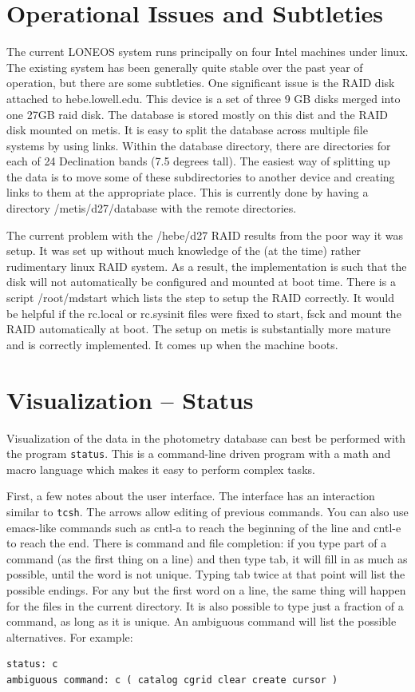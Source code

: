 \documentclass{article}
\begin{document}
\section{Operational Issues and Subtleties}

The current LONEOS system runs principally on four Intel machines
under linux.  The existing system has been generally quite stable over
the past year of operation, but there are some subtleties.  One
significant issue is the RAID disk attached to hebe.lowell.edu.  This
device is a set of three 9 GB disks merged into one 27GB raid disk.
The database is stored mostly on this dist and the RAID disk mounted
on metis.  It is easy to split the database across multiple file
systems by using links.  Within the database directory, there are
directories for each of 24 Declination bands (7.5 degrees tall).  The
easiest way of splitting up the data is to move some of these
subdirectories to another device and creating links to them at the
appropriate place.  This is currently done by having a directory
/metis/d27/database with the remote directories.  

The current problem with the /hebe/d27 RAID results from the poor way
it was setup.  It was set up without much knowledge of the (at the
time) rather rudimentary linux RAID system.  As a result, the
implementation is such that the disk will not automatically be
configured and mounted at boot time.  There is a script /root/mdstart
which lists the step to setup the RAID correctly.  It would be helpful
if the rc.local or rc.sysinit files were fixed to start, fsck and
mount the RAID automatically at boot.  The setup on metis is
substantially more mature and is correctly implemented.  It comes up
when the machine boots.

\section{Visualization -- Status}

Visualization of the data in the photometry database can best be
performed with the program {\tt status}.  This is a command-line
driven program with a math and macro language which makes it easy to
perform complex tasks.  

First, a few notes about the user interface.  The interface has an
interaction similar to {\tt tcsh}.  The arrows allow editing of
previous commands.  You can also use emacs-like commands such as
cntl-a to reach the beginning of the line and cntl-e to reach the end.
There is command and file completion: if you type part of a command
(as the first thing on a line) and then type tab, it will fill in as
much as possible, until the word is not unique.  Typing tab twice at
that point will list the possible endings.  For any but the first word
on a line, the same thing will happen for the files in the current
directory.  It is also possible to type just a fraction of a command,
as long as it is unique.  An ambiguous command will list the possible
alternatives.  For example:
\begin{verbatim}
status: c
ambiguous command: c ( catalog cgrid clear create cursor )
\end{verbatim}
\end{document}
